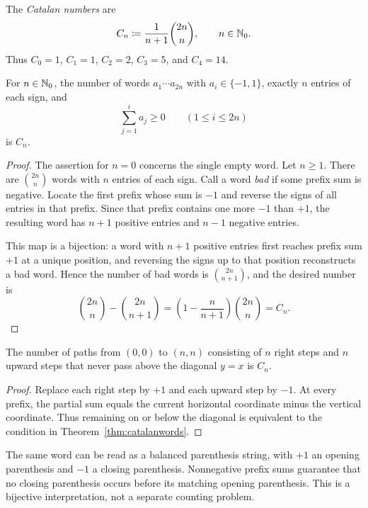 \documentclass[11pt, oneside]{article}
\begin{document}
\begin{definition}
The \emph{Catalan numbers} are
\[
C_n\coloneqq\frac1{n+1}\binom{2n}{n}, \qquad n\in\mathbb{N}_0.
\]
Thus $C_0=1$, $C_1=1$, $C_2=2$, $C_3=5$, and $C_4=14$.
\end{definition}
\begin{theorem}\label{thm:catalanwords}
For $n\in\mathbb{N}_0$, the number of words $a_1\cdots a_{2n}$ with $a_i\in\{-1, 1\}$, exactly $n$ entries of each sign, and
\[
\sum_{j=1}^i a_j\ge0\qquad(1\le i\le 2n)
\]
is $C_n$.
\end{theorem}
\begin{proof}
The assertion for $n=0$ concerns the single empty word. Let $n\ge1$. There are $\binom{2n}{n}$ words with $n$ entries of each sign. Call a word \emph{bad} if some prefix sum is negative. Locate the first prefix whose sum is $-1$ and reverse the signs of all entries in that prefix. Since that prefix contains one more $-1$ than $+1$, the resulting word has $n+1$ positive entries and $n-1$ negative entries.

This map is a bijection: a word with $n+1$ positive entries first reaches prefix sum $+1$ at a unique position, and reversing the signs up to that position reconstructs a bad word. Hence the number of bad words is $\binom{2n}{n+1}$, and the desired number is
\[
\binom{2n}{n}-\binom{2n}{n+1}
=\left(1-\frac{n}{n+1}\right)\binom{2n}{n}
=C_n.
\]
\end{proof}
\begin{corollary}\label{cor:catpaths}
The number of paths from $(0, 0)$ to $(n, n)$ consisting of $n$ right steps and $n$ upward steps that never pass above the diagonal $y=x$ is $C_n$.
\end{corollary}
\begin{proof}
Replace each right step by $+1$ and each upward step by $-1$. At every prefix, the partial sum equals the current horizontal coordinate minus the vertical coordinate. Thus remaining on or below the diagonal is equivalent to the condition in Theorem~\ref{thm:catalanwords}.
\end{proof}
\begin{remark}
The same word can be read as a balanced parenthesis string, with $+1$ an opening parenthesis and $-1$ a closing parenthesis. Nonnegative prefix sums guarantee that no closing parenthesis occurs before its matching opening parenthesis. This is a bijective interpretation, not a separate counting problem.
\end{remark}
\end{document}
